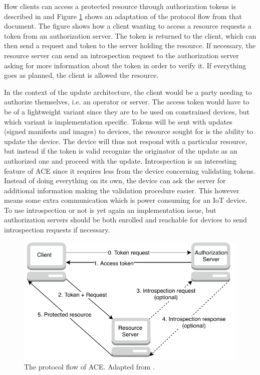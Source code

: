 \documentclass[0-thesis.tex]{subfiles}
\begin{document}
How clients can access a protected resource through authorization tokens is described in
\parencite{ace} and Figure \ref{fig:ace-flow} shows an adaptation of the protocol flow
from that document. The figure shows how a client wanting to access a resource requests a
token from an authorization server. The token is returned to the client, which can then
send a request and token to the server holding the resource. If necessary, the resource
server can send an introspection request to the authorization server asking for more
information about the token in order to verify it. If everything goes as planned, the
client is allowed the resource.

In the context of the update architecture, the client would be a party needing to
authorize themselves, i.e. an operator or server. The access token would have to be of a
lightweight variant since they are to be used on constrained devices, but which variant is
implementation specific. Tokens will be sent with updates (signed manifests and images) to
devices, the resource sought for is the ability to update the device. The device will thus
not respond with a particular resource, but instead if the token is valid recognize the
originator of the update as an authorized one and proceed with the update. Introspection
is an interesting feature of ACE since it requires less from the device concerning
validating tokens. Instead of doing everything on its own, the device can ask the server
for additional information making the validation procedure easier. This however means some
extra communication which is power consuming for an IoT device. To use introspection or
not is yet again an implementation issue, but authorization servers should be both
enrolled and reachable for devices to send introspection requests if necessary.

\begin{figure}
    \caption{The protocol flow of ACE. Adapted from \parencite{ace}.}
    \label{fig:ace-flow}
    \includegraphics{images/ace.pdf}
\end{figure}
\end{document}

